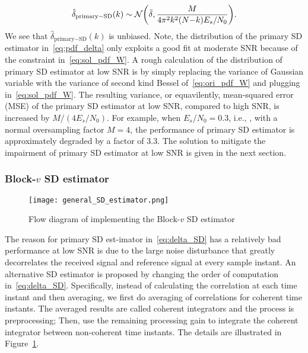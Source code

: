 \begin{equation}
    \label{eq:pdf_delta}
        \hat{\delta}_{\text{primary}-\text{SD}}(k) \sim \mathcal{N} \bigg(\bar{\delta},\frac{M}{4\pi^2k^2(N{-}k)E_s/N_0}\bigg).
  \end{equation}  
We see that $\hat{\delta}_{\text{primary}-\text{SD}}(k)$ is unbiased. 
Note, the distribution of the primary SD estimator in~\eqref{eq:pdf_delta} only exploits a good fit at moderate SNR because of
the constraint in~\eqref{eq:sol_pdf_W}. A rough calculation of the distribution of primary SD estimator at low SNR is by simply 
replacing the variance of Gaussian variable with the variance of second kind Bessel
of~\eqref{eq:ori_pdf_W} and plugging in~\eqref{eq:sol_pdf_W}. The resulting variance, or equavilently, mean-squared error (MSE) of the primary 
SD estimator at low SNR, compared to high SNR, is increased by $M/(4E_s/N_0)$.
For example, when $E_s/N_0=0.3$, i.e., \dB, with a normal oversampling factor $M=4$,
the performance of primary SD estimator is approximately degraded by a factor of 3.3.
The solution to mitigate the impairment of primary SD estimator at low SNR
is given in the next section.

\subsubsection{Block-$v$ SD estimator}

\begin{figure}[t]
  \centerline{\texttt{[image: general\_SD\_estimator.png]}}
  \caption{Flow diagram of implementing the Block-$v$ SD estimator}
  \label{fig:general_SD_estimator}
  \end{figure}

The reason for primary SD est-imator in~\eqref{eq:delta_SD} has a relatively bad performance at low SNR is due to the large noise
disturbance that greatly decorrelates the received signal and reference signal at every sample instant.
An alternative SD estimator is proposed by changing the order of computation in~\eqref{eq:delta_SD}.
Specifically, instead of calculating the correlation at each time instant and then averaging, we first do averaging of 
correlations for coherent time instants. The averaged results are called coherent integrators and the process is preprocessing; Then, use the remaining processing gain to integrate 
the coherent integrator between non-coherent time instants.
The details are illustrated in Figure~\ref{fig:general_SD_estimator}. 

